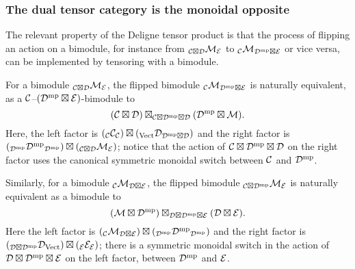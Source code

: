 \documentclass{amsart}
\begin{document}
\subsubsection{The dual tensor category is the monoidal opposite}

The relevant property of the Deligne tensor product is that the process of flipping an action on a bimodule, for instance from ${}_{\mathcal C \boxtimes \mathcal D} \mathcal M_\mathcal E$ to ${}_\mathcal C \mathcal M_{\mathcal D^{\mathrm{mp}} \boxtimes \mathcal E}$ or vice versa, can be implemented by tensoring with a bimodule.
\begin{lemma} \label{lemma:flip}
For a bimodule ${}_{\mathcal C \boxtimes \mathcal D} \mathcal M_\mathcal E$, the flipped bimodule ${}_\mathcal C \mathcal M_{\mathcal D^{\mathrm{mp}} \boxtimes \mathcal E}$ is naturally equivalent, as a $\mathcal C$--$(\mathcal D^{\mathrm{mp}} \boxtimes \mathcal E)$-bimodule to
\[
(\mathcal C \boxtimes \mathcal D) \boxtimes_{\mathcal C \boxtimes \mathcal D^{\mathrm{mp}} \boxtimes \mathcal D} (\mathcal D^{\mathrm{mp}} \boxtimes \mathcal M).
\]
Here, the left factor is $({}_\mathcal C \mathcal C_\mathcal C) \boxtimes ({}_{\mathrm{Vect}} \mathcal D_{\mathcal D^{\mathrm{mp}} \boxtimes \mathcal D})$ and the right factor is $({}_{\mathcal D^{\mathrm{mp}}} {\mathcal D^{\mathrm{mp}}}_{\mathcal D^{\mathrm{mp}}}) \boxtimes ({}_{\mathcal C \boxtimes \mathcal D} \mathcal M_\mathcal E)$; notice that the action of $\mathcal C \boxtimes \mathcal D^{\mathrm{mp}} \boxtimes \mathcal D$ on the right factor uses the canonical symmetric monoidal switch between $\mathcal C$ and $\mathcal D^{\mathrm{mp}}$.

Similarly, for a bimodule ${}_\mathcal C \mathcal M_{\mathcal D \boxtimes \mathcal E}$, the flipped bimodule ${}_{\mathcal C \boxtimes \mathcal D^{\mathrm{mp}}} \mathcal M_\mathcal E$ is naturally equivalent as a bimodule to
\[
(\mathcal M \boxtimes \mathcal D^{\mathrm{mp}}) \boxtimes_{\mathcal D \boxtimes \mathcal D^{\mathrm{mp}} \boxtimes \mathcal E} (\mathcal D \boxtimes \mathcal E).
\]
Here the left factor is $({}_\mathcal C \mathcal M_{\mathcal D \boxtimes \mathcal E}) \boxtimes ({}_{\mathcal D^{\mathrm{mp}}} {\mathcal D^{\mathrm{mp}}}_{\mathcal D^{\mathrm{mp}}})$ and the right factor is $({}_{\mathcal D \boxtimes \mathcal D^{\mathrm{mp}}} \mathcal D_{\mathrm{Vect}}) \boxtimes ({}_\mathcal E \mathcal E_\mathcal E)$; there is a symmetric monoidal switch in the action of $\mathcal D \boxtimes \mathcal D^{\mathrm{mp}} \boxtimes \mathcal E$ on the left factor, between $\mathcal D^{\mathrm{mp}}$ and $\mathcal E$.
\end{lemma}
\end{document}
